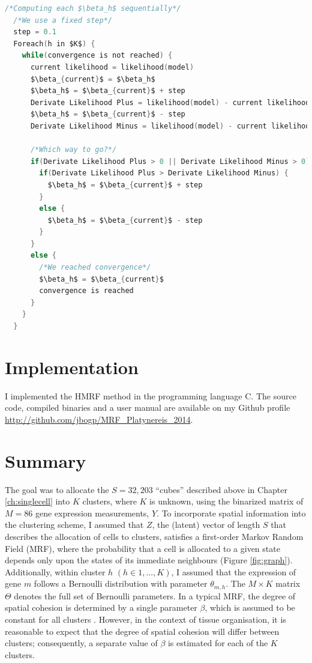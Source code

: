 \begin{lstlisting}[mathescape,caption=Gradient ascent algorithm in C pseudo-code,label=algo:grad,language=C]
/*Computing each $\beta_h$ sequentially*/
  /*We use a fixed step*/
  step = 0.1
  Foreach(h in $K$) {
    while(convergence is not reached) {
      current likelihood = likelihood(model)
      $\beta_{current}$ = $\beta_h$
      $\beta_h$ = $\beta_{current}$ + step
      Derivate Likelihood Plus = likelihood(model) - current likelihood
      $\beta_h$ = $\beta_{current}$ - step
      Derivate Likelihood Minus = likelihood(model) - current likelihood
      
      /*Which way to go?*/
      if(Derivate Likelihood Plus > 0 || Derivate Likelihood Minus > 0) {
        if(Derivate Likelihood Plus > Derivate Likelihood Minus) {
          $\beta_h$ = $\beta_{current}$ + step
        }
        else {
          $\beta_h$ = $\beta_{current}$ - step
        }
      }
      else {
        /*We reached convergence*/
        $\beta_h$ = $\beta_{current}$
        convergence is reached
      }
    }
  }
\end{lstlisting}

\section{Implementation}
I implemented the HMRF method in the programming language C. The source code, compiled binaries and a user manual are available on my Github profile \url{http://github.com/jbogp/MRF_Platynereis_2014}.

\section{Summary}
The goal was to allocate the $S=32,203$ ``cubes'' described above in Chapter \ref{ch:singlecell} into $K$ clusters, where $K$ is unknown, using the binarized matrix of $M=86$ gene expression measurements, $Y$. To incorporate spatial information into the clustering scheme, I assumed that $Z$, the (latent) vector of length $S$ that describes the allocation of cells to clusters, satisfies a first-order Markov Random Field (MRF), where the probability that a cell is allocated to a given state depends only upon the states of its immediate neighbours (Figure \ref{fig:graph}). Additionally, within cluster $h$ $(h \in {1,...,K})$, I assumed that the expression of gene $m$ follows a Bernoulli distribution with parameter $\theta_{m,h}$. The $M \times K$ matrix  $\Theta$ denotes the full set of Bernoulli parameters. In a typical MRF, the degree of spatial cohesion is determined by a single parameter $\beta$, which is assumed to be constant for all clusters \citep{subudhi14,zhang14}. However, in the context of tissue organisation, it is reasonable to expect that the degree of spatial cohesion will differ between clusters; consequently,  a separate value of $\beta$ is estimated for each of the $K$ clusters.\\

